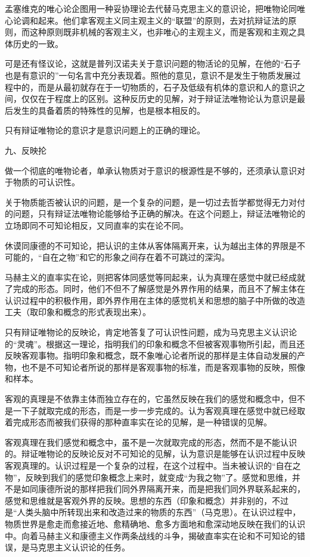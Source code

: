 孟塞维克的唯心论企图用一种妥协理论去代替马克思主义的意识论，把唯物论同唯心论调和起来。他们拿客观主义同主观主义的“联盟”的原则，去对抗辩证法的原则，而这种原则既非机械的客观主义，也非唯心的主观主义，而是客观和主观之具体历史的一致。

可是还有怪议论，这就是普列汉诺夫关于意识问题的物活论的见解，在他的“石子也是有意识的”一句名言中充分表现着。照他的意见，意识不是发生于物质发展过程中的，而是从最初就存在于一切物质的，石子及低级有机体的意识和人的意识之间，仅仅在于程度上的区别。这种反历史的见解，对于辩证法唯物论认为意识是最后发生的具备着质的特殊性的见解，也是根本相反的。

只有辩证唯物论的意识才是意识问题上的正确的理论。

九、反映抡

做一个彻底的唯物论者，单承认物质对于意识的根源性是不够的，还须承认意识对于物质的可认识性。

关于物质能否被认识的问题，是一个复杂的问题，是一切过去哲学都觉得无力对付的问题，只有辩证法唯物论能够给予正确的解决。在这个问题上，辩证法唯物论的立场即同不可知论相反，又同直率的实在论不同。

休谟同康德的不可知论，把认识的主体从客体隔离开来，认为越出主体的界限是不可能的，“自在之物”和它的形象之间存在着不可跳过的深沟。

马赫主义的直率实在论，则把客体同感觉等同起来，认为真理在感觉中就已经成就了完成的形态。同时，他们不但不了解感觉是外界作用的结果，而且不了解主体在认识过程中的积极作用，即外界作用在主体的感觉机关和思想的脑子中所做的改造工夫（取印象和概念的形式表现出来）。

只有辩证唯物论的反映论，肯定地答复了可认识性问题，成为马克思主义认识论的“灵魂”。根据这一理论，指明我们的印象和概念不但被客观事物所引起，而且还反映客观事物。指明印象和概念，既不象唯心论者所说的那样是主体自动发展的产物，也不是不可知论者所说的那样是客观事物的标准，而是客观事物的反映，照像和样本。

客观的真理是不依靠主体而独立存在的，它虽然反映在我们的感觉和概念中，但不是一下子就取完成的形态，而是一步一步完成的。认为客观真理在感觉中就已经取着完成形态而被我们获得的那种直率实在论的见解，是一种错误的见解。

客观真理在我们感觉和概念中，虽不是一次就取完成的形态，然而不是不能认识的。辩证唯物论的反映论反对不可知论的见解，认为意识是能够在认识过程中反映客观真理的。认识过程是一个复杂的过程，在这个过程中。当未被认识的“自在之物”，反映到我们的感觉印象概念上来时，就变成“为我之物”了。感觉和思维，并不是如同康德所说的那样把我们同外界隔离开来，而是把我们同外界联系起来的，感觉和思维就是客观外界的反映。思想的东西（印象和概念）并非别的，不过是“人类头脑中所转现出来和改造过来的物质的东西”（马克思）。在认识过程中，物质世界是愈走而愈接近地、愈精确地、愈多方面地和愈深动地反映在我们的认识中。向着马赫主义和康德主义作两条战线的斗争，揭破直率实在论和不可知论的错误，是马克思主义认识论的任务。

